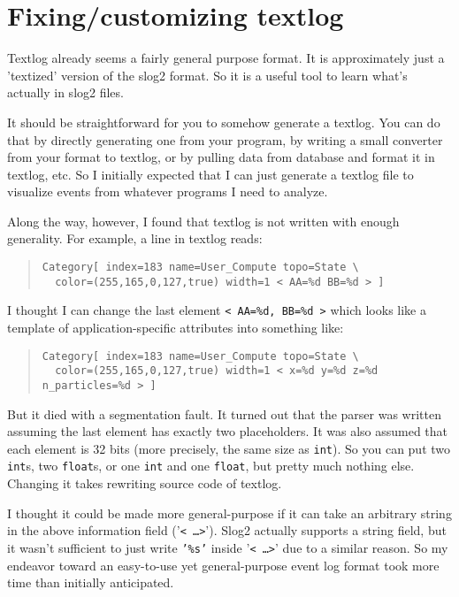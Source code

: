 \documentclass{article}
\begin{document}
\section{Fixing/customizing textlog}
Textlog already seems a fairly general purpose format.
It is approximately just a 'textized' version of the slog2 format.
So it is a useful tool to learn what's actually in slog2 files.

It should be straightforward for you to somehow generate a textlog.
You can do that by directly generating one from your program, 
by writing a small converter from your format to textlog, or
by pulling data from database and format it in textlog, etc.
So I initially expected that I can just generate a textlog file
to visualize events from whatever programs I need to analyze.

Along the way, however, I found that
textlog is not written with enough generality.  For example, 
a line in textlog reads:
\begin{quote}
\begin{verbatim}
Category[ index=183 name=User_Compute topo=State \
  color=(255,165,0,127,true) width=1 < AA=%d BB=%d > ]
\end{verbatim}
\end{quote}
I thought I can change the last element {\tt < AA=\%d, BB=\%d >} which looks like a template 
of application-specific attributes into something like:
\begin{quote}
\begin{verbatim}
Category[ index=183 name=User_Compute topo=State \
  color=(255,165,0,127,true) width=1 < x=%d y=%d z=%d n_particles=%d > ]
\end{verbatim}
\end{quote}
But it died with a segmentation fault.  It turned out that the parser was written assuming the last element has exactly
two placeholders.  It was also assumed that each element is 32 bits (more precisely, the same size as {\tt int}).
So you can put two {\tt int}s, two {\tt float}s, or one {\tt int} and one {\tt float}, but pretty much nothing else.
Changing it takes rewriting source code of textlog.

I thought it could be made more general-purpose if it can take
an arbitrary string in the above information field ('{\tt < \ldots >}').
Slog2 actually supports a string field, but it wasn't sufficient to just write
{\tt '\%s'} inside '{\tt < \ldots >}' due to a similar reason.
So my endeavor toward an easy-to-use yet general-purpose event log format 
took more time than initially anticipated.  
\end{document}
